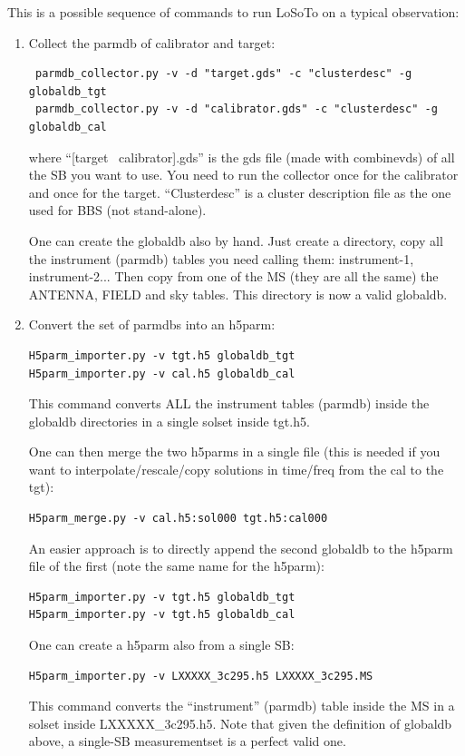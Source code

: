 \documentclass[]{article}
\def \losoto {LoSoTo}
\begin{document}
This is a possible sequence of commands to run \losoto{} on a typical observation:
\begin{enumerate}

\item Collect the parmdb of calibrator and target:
\begin{verbatim}
 parmdb_collector.py -v -d "target.gds" -c "clusterdesc" -g globaldb_tgt
 parmdb_collector.py -v -d "calibrator.gds" -c "clusterdesc" -g globaldb_cal
\end{verbatim}
where ``[target \textbar\ calibrator].gds'' is the gds file (made with combinevds) of all the SB you want to use. You need to run the collector once for the calibrator and once for the target. ``Clusterdesc'' is a cluster description file as the one used for BBS (not stand-alone).

One can create the globaldb also by hand. Just create a directory, copy all the instrument (parmdb) tables you need calling them: instrument-1, instrument-2... Then copy from one of the MS (they are all the same) the ANTENNA, FIELD and sky tables. This directory is now a valid globaldb.

\item Convert the set of parmdbs into an h5parm:
\begin{verbatim}
H5parm_importer.py -v tgt.h5 globaldb_tgt
H5parm_importer.py -v cal.h5 globaldb_cal
\end{verbatim}
This command converts ALL the instrument tables (parmdb) inside the globaldb directories in a single solset inside tgt.h5.

One can then merge the two h5parms in a single file (this is needed if you want to interpolate/rescale/copy solutions in time/freq from the cal to the tgt):
\begin{verbatim}
H5parm_merge.py -v cal.h5:sol000 tgt.h5:cal000
\end{verbatim}

An easier approach is to directly append the second globaldb to the h5parm file of the first (note the same name for the h5parm):
\begin{verbatim}
H5parm_importer.py -v tgt.h5 globaldb_tgt
H5parm_importer.py -v tgt.h5 globaldb_cal
\end{verbatim}

One can create a h5parm also from a single SB:
\begin{verbatim}
H5parm_importer.py -v LXXXXX_3c295.h5 LXXXXX_3c295.MS
\end{verbatim}
This command converts the ``instrument'' (parmdb) table inside the MS in a solset inside LXXXXX\_3c295.h5. Note that given the definition of globaldb above, a single-SB measurementset is a perfect valid one.


\end{enumerate}
\end{document}
